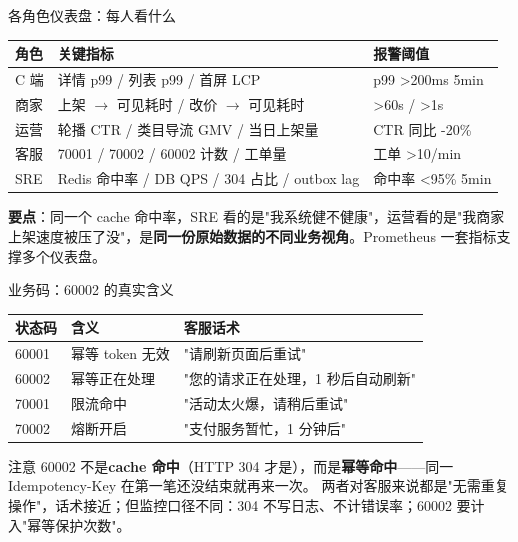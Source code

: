 \documentclass[aspectratio=169,11pt]{beamer}
\begin{document}
\begin{frame}[shrink]{各角色仪表盘：每人看什么}
\footnotesize
\begin{tabular}{@{}p{14mm}p{55mm}p{28mm}@{}}
\toprule
角色 & 关键指标 & 报警阈值 \\
\midrule
C 端 & 详情 p99 / 列表 p99 / 首屏 LCP & p99 \textgreater 200ms 5min \\
商家 & 上架 $\to$ 可见耗时 / 改价 $\to$ 可见耗时 & \textgreater 60s / \textgreater 1s \\
运营 & 轮播 CTR / 类目导流 GMV / 当日上架量 & CTR 同比 -20\% \\
客服 & 70001 / 70002 / 60002 计数 / 工单量 & 工单 \textgreater 10/min \\
SRE  & Redis 命中率 / DB QPS / 304 占比 / outbox lag & 命中率 \textless 95\% 5min \\
\bottomrule
\end{tabular}
\vspace{2mm}

\textbf{要点}：同一个 cache 命中率，SRE 看的是"我系统健不健康"，运营看的是"我商家上架速度被压了没"，是\textbf{同一份原始数据的不同业务视角}。Prometheus 一套指标支撑多个仪表盘。
\end{frame}

\begin{frame}[shrink]{业务码：60002 的真实含义}
\footnotesize
\begin{tabular}{@{}lll@{}}
\toprule
状态码 & 含义       & 客服话术 \\
\midrule
60001  & 幂等 token 无效 & "请刷新页面后重试" \\
60002  & 幂等正在处理   & "您的请求正在处理，1 秒后自动刷新" \\
70001  & 限流命中       & "活动太火爆，请稍后重试" \\
70002  & 熔断开启       & "支付服务暂忙，1 分钟后" \\
\bottomrule
\end{tabular}
\vspace{2mm}

注意 60002 不是\textbf{cache 命中}（HTTP 304 才是），而是\textbf{幂等命中}——同一 Idempotency-Key 在第一笔还没结束就再来一次。
两者对客服来说都是"无需重复操作"，话术接近；但监控口径不同：304 不写日志、不计错误率；60002 要计入"幂等保护次数"。
\end{frame}
\end{document}
